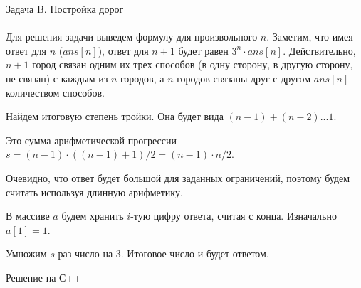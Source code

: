 {\large Задача B. Постройка дорог} 
\\
\\
Для решения задачи выведем формулу для произвольного $n$.
Заметим, что имея ответ для $n$ ($ans[n]$), ответ для $n+1$ будет равен $3^{n} \cdot ans[n]$.
Действительно, $n+1$ город связан одним их трех способов (в одну сторону, в другую сторону, не связан) с каждым из $n$ городов, а $n$ городов связаны друг с другом $ans[n]$ количеством способов. 

Найдем итоговую степень тройки. Она будет вида $(n-1) + (n-2) ... 1$.

Это сумма арифметической прогрессии $s = (n-1) \cdot ((n-1) + 1)/2 = (n-1) \cdot n/2$.

Очевидно, что ответ будет большой для заданных ограничений, поэтому будем считать используя длинную арифметику.

В массиве $a$ будем хранить $i$-тую цифру ответа, считая с конца. Изначально $a[1] = 1$.

Умножим $s$ раз число на 3. Итоговое число и будет ответом.


\newpage
{\large Решение на С++}
\\
\\

